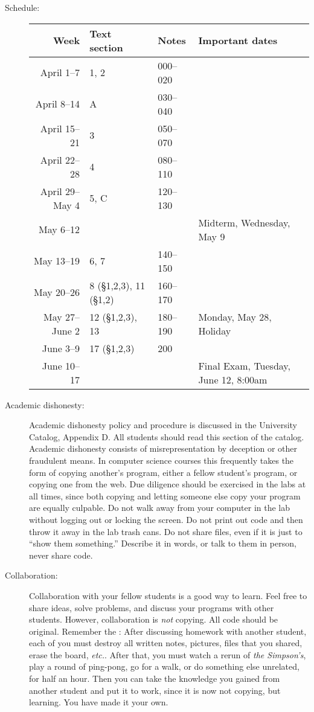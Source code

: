 \documentclass{article}
\begin{document}
\begin{description}
\item [Schedule:]\mbox{}

\begin{tabular}{r|lll}                      
     Week & Text section & Notes & Important dates \\\hline  
     April 1--7&  1, 2 & 000--020 \\
     April 8--14& A  & 030--040\\
     April 15--21 & 3 & 050--070 \\
     April 22--28 & 4 & 080--110 \\
     April 29--May 4 & 5, C & 120--130 & \\
     May 6--12 &&& Midterm, Wednesday, May 9\\
     May 13--19 & 6, 7 & 140--150 \\ 
     May 20--26 &  8 (\S 1,2,3), 11 (\S 1,2) & 160--170 \\
     May 27--June 2 & 12 (\S 1,2,3), 13& 180--190 & Monday, May 28, Holiday\\
     June 3--9 &17 (\S 1,2,3)& 200 \\
     June 10--17 &&&  Final Exam, Tuesday, June 12, 8:00am \\
\end{tabular}


\item [Academic dishonesty:] Academic dishonesty policy and
  procedure is discussed in the University Catalog, Appendix D.  All
  students should read this section of the catalog.  Academic
  dishonesty consists of misrepresentation by deception or other
  fraudulent means.  In computer science courses this frequently takes
  the form of copying another's program, either a fellow student's
  program, or copying one from the web.  Due diligence should be
  exercised in the labs at all times, since both copying and letting
  someone else copy your program are equally culpable.  Do not walk
  away from your computer in the lab without logging out or locking
  the screen.  Do not print out code and then throw it away in the lab
  trash cans. Do not share files, even if it is just to ``show them
  something.''  Describe it in words, or talk to them in person, never
  share code.

\item [Collaboration:] Collaboration with your fellow students is
  a good way to learn.  Feel free to share ideas, solve problems, and
  discuss your programs with other students.  However, collaboration
  is {\em not} copying.  All code should be original.  Remember the
  : After discussing homework with
  another student, each of you must destroy all written notes,
  pictures, files that you shared, erase the board, {\em
    etc.}.  After that, you must watch a rerun of {\em the Simpson's},
  play a round of ping-pong, go for a walk, or do something else
  unrelated, for half an hour.  Then you can take the knowledge you
  gained from another student and put it to work, since it is now not
  copying, but learning.  You have made it your own.

\end{description}
\end{document}

